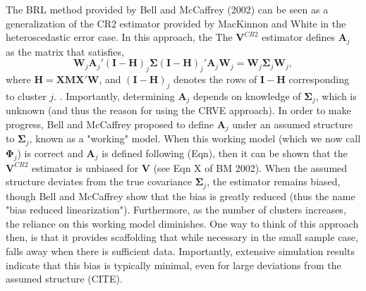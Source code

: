 \documentclass[12pt]{article}
\newcommand{\bm}{\mathbf}
\newcommand{\bs}{\boldsymbol}
\begin{document}
The BRL method provided by Bell and McCaffrey (2002) can be seen as a generalization of the CR2 estimator provided by MacKinnon and White in the heteroscedastic error case. In this approach, the The $\bm{V}^{CR2}$ estimator defines $\bm{A}_j$ as the matrix that satisfies,
\begin{equation}
\label{eq:CR2_criterion}
\bm{W}_j \bm{A}_j' \left(\bm{I} - \bm{H}\right)_j \bs{\Sigma} \left(\bm{I} - \bm{H}\right)_j' \bm{A}_j \bm{W}_j =  \bm{W}_j \bs{\Sigma}_j \bm{W}_j,
\end{equation}
where $\bm{H} = \bm{X}\bm{M}\bm{X}'\bm{W}$, and $\left(\bm{I} - \bm{H}\right)_j$ denotes the rows of $\bm{I} - \bm{H}$ corresponding to cluster $j$. . 
Importantly, determining $\bm{A}_j$ depends on knowledge of $\bs{\Sigma}_j$, which is unknown (and thus the reason for using the CRVE approach). 
In order to make progress, Bell and McCaffrey proposed to define $\bm{A}_j$ under an assumed structure to $\bs{\Sigma}_j$, known as a "working" model. 
When this working model (which we now call $\bs\Phi_j$) is correct and $\bm{A}_j$ is defined following (Eqn), then it can be shown that the $\bm{V}^{CR2}$ estimator is unbiased for $\bm{V}$ (see Eqn X of BM 2002). 
When the assumed structure deviates from the true covariance $\bs{\Sigma}_j$, the estimator remains biased, though Bell and McCaffrey show that the bias is greatly reduced (thus the name "bias reduced linearization"). 
Furthermore, as the number of clusters increases, the reliance on this working model diminishes. 
One way to think of this approach then, is that it provides scaffolding that while necessary in the small sample case, falls away when there is sufficient data.
Importantly, extensive simulation results indicate that this bias is typically minimal, even for large deviations from the assumed structure (CITE).
\end{document}
